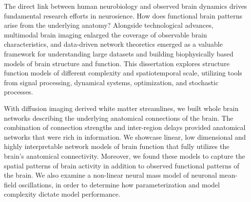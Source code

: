 The direct link between human neurobiology and observed brain dynamics drives fundamental research efforts in neurosience. How does functional brain patterns arise from the underlying anatomy? Alongside technological advances, multimodal brain imaging enlarged the coverage of observable brain characteristics, and data-driven network theoretics emerged as a valuable framework for understanding large datasets and building biophysically based models of brain structure and function. This dissertation explores structure function models of different complexity and spatiotemporal scale, utilizing tools from signal processing, dynamical systems, optimization, and stochastic processes. 

With diffusion imaging derived white matter streamlines, we built whole brain networks describing the underlying anatomical connections of the brain. The combination of connection strengths and inter-region delays provided anatomical networks that were rich in information. We showcase linear, low dimensional and highly interpretable network models of brain function that fully utilizes the brain's anatomical connectivity. Moreover, we found these models to capture the spatial patterns of brain activity in addition to observed functional patterns of the brain. We also examine a non-linear neural mass model of neuronal mean-field oscillations, in order to determine how parameterization and model complexity dictate model performance.
